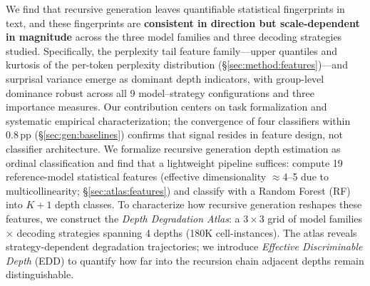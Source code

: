 We find that recursive generation leaves quantifiable statistical fingerprints in text, and these fingerprints are \textbf{consistent in direction but scale-dependent in magnitude} across the three model families and three decoding strategies studied.
Specifically, the perplexity tail feature family---upper quantiles and kurtosis of the per-token perplexity distribution (\S\ref{sec:method:features})---and surprisal variance emerge as dominant depth indicators, with group-level dominance robust across all 9 model--strategy configurations and three importance measures.
Our contribution centers on task formalization and systematic empirical characterization; the convergence of four classifiers within 0.8\,pp (\S\ref{sec:gen:baselines}) confirms that signal resides in feature design, not classifier architecture.
We formalize recursive generation depth estimation as ordinal classification and find that a lightweight pipeline suffices: compute 19 reference-model statistical features (effective dimensionality ${\approx}$4--5 due to multicollinearity; \S\ref{sec:atlas:features}) and classify with a Random Forest (RF) into $K{+}1$ depth classes.
To characterize how recursive generation reshapes these features, we construct the \emph{Depth Degradation Atlas}: a $3 \times 3$ grid of model families $\times$ decoding strategies spanning 4 depths (180K cell-instances).
The atlas reveals strategy-dependent degradation trajectories; we introduce \emph{Effective Discriminable Depth} (EDD) to quantify how far into the recursion chain adjacent depths remain distinguishable.

